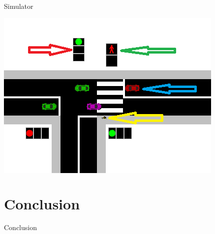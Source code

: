 \documentclass{bredelebeamer}
\begin{document}
\begin{frame}{Simulator}

\centering
\includegraphics[scale=0.8]{images/SimP.PNG}

\end{frame}


\section{Conclusion}
\begin{frame}{Conclusion}

\end{frame}
\end{document}
